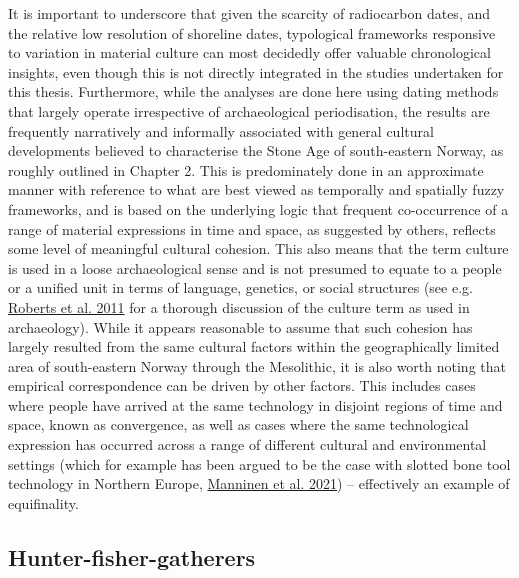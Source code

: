 \documentclass[
  a4paper,
  oneside]{uiophdthesis}
\begin{document}
It is important to underscore that given the scarcity of radiocarbon dates, and the relative low resolution of shoreline dates, typological frameworks responsive to variation in material culture can most decidedly offer valuable chronological insights, even though this is not directly integrated in the studies undertaken for this thesis. Furthermore, while the analyses are done here using dating methods that largely operate irrespective of archaeological periodisation, the results are frequently narratively and informally associated with general cultural developments believed to characterise the Stone Age of south-eastern Norway, as roughly outlined in Chapter 2. This is predominately done in an approximate manner with reference to what are best viewed as temporally and spatially fuzzy frameworks, and is based on the underlying logic that frequent co-occurrence of a range of material expressions in time and space, as suggested by others, reflects some level of meaningful cultural cohesion. This also means that the term culture is used in a loose archaeological sense and is not presumed to equate to a people or a unified unit in terms of language, genetics, or social structures (see e.g. \protect\hyperlink{ref-roberts2011}{Roberts et al. 2011} for a thorough discussion of the culture term as used in archaeology). While it appears reasonable to assume that such cohesion has largely resulted from the same cultural factors within the geographically limited area of south-eastern Norway through the Mesolithic, it is also worth noting that empirical correspondence can be driven by other factors. This includes cases where people have arrived at the same technology in disjoint regions of time and space, known as convergence, as well as cases where the same technological expression has occurred across a range of different cultural and environmental settings (which for example has been argued to be the case with slotted bone tool technology in Northern Europe, \protect\hyperlink{ref-manninen2021}{Manninen et al. 2021}) -- effectively an example of equifinality.

\hypertarget{hunter-fisher-gatherers}{%
\subsection{Hunter-fisher-gatherers}\label{hunter-fisher-gatherers}}
\end{document}
